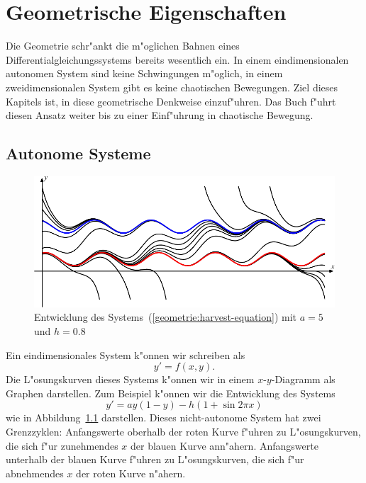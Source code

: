 %
%
%
\chapter{Geometrische Eigenschaften\label{chapter:geometrie}}
\lhead{}
Die Geometrie schr"ankt die m"oglichen Bahnen eines
Differentialgleichungssystems bereits wesentlich ein.
In einem eindimensionalen autonomen System sind keine
Schwingungen m"oglich, in einem zweidimensionalen
System gibt es keine chaotischen Bewegungen.
Ziel dieses Kapitels ist, in diese geometrische
Denkweise einzuf"uhren.
Das Buch \cite{skript:hirsch} f"uhrt diesen Ansatz weiter bis zu
einer Einf"uhrung in chaotische Bewegung.

\section{Autonome Systeme}
\begin{figure}
\centering
\includegraphics{chapters/images/geometrie-13.pdf}
\caption{Entwicklung des Systems~(\ref{geometrie:harvest-equation})
mit $a=5$ und $h=0.8$
\label{geometrie:harvest-graph}}
\end{figure}%
Ein eindimensionales System k"onnen wir schreiben als
\[
y'=f(x,y).
\]
Die L"osungskurven dieses Systems k"onnen wir in einem $x$-$y$-Diagramm
als Graphen darstellen.
Zum Beispiel k"onnen wir die Entwicklung des Systems
\begin{equation}
y' = ay(1-y)-h(1+\sin 2\pi x)
\label{geometrie:harvest-equation}
\end{equation}
wie in Abbildung~\ref{geometrie:harvest-graph} darstellen.
Dieses nicht-autonome System hat zwei Grenzzyklen: 
Anfangswerte oberhalb der roten Kurve f"uhren zu L"osungskurven, die
sich f"ur zunehmendes $x$ der blauen Kurve ann"ahern.
Anfangswerte unterhalb der blauen Kurve f"uhren zu L"osungskurven, die
sich f"ur abnehmendes $x$ der roten Kurve n"ahern.

